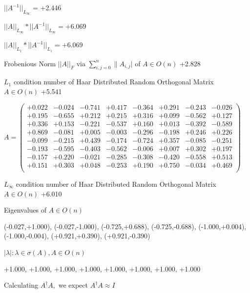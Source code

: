 \documentclass[9pt]{article}
\theoremstyle{plain}
\theoremstyle{definition}
\theoremstyle{remark}
\numberwithin{equation}{section}
\begin{document}
$||A^{-1}||_{L_{\infty}}$ = +2.446

$||A||_{L_{\infty}} * ||A^{-1}||_{L_{\infty}} = +6.069$

$||A||_{L_1} * ||A^{-1}||_{L_1} = +6.069$

Frobenious Norm  $||A||_{\textit{F}}$ via $\sum\limits_{i,j =0}^{n} \|A_{i,j}|$   of  $A \in O(n)$  +2.828

$L_1$ condition number of Haar Distributed Random Orthogonal Matrix $A \in O(n)$ +5.541

$A = \left(
\begin{array}{
cccccccc}
+0.022 & -0.024 & -0.741 & +0.417 & -0.364 & +0.291 & -0.243 & -0.026 \\
+0.195 & -0.655 & +0.212 & +0.215 & +0.316 & +0.099 & -0.562 & +0.127 \\
+0.336 & +0.153 & -0.221 & -0.537 & +0.160 & +0.013 & -0.392 & -0.589 \\
+0.869 & -0.081 & +0.005 & -0.003 & -0.296 & -0.198 & +0.246 & +0.226 \\
-0.099 & -0.215 & +0.439 & -0.174 & -0.724 & +0.357 & -0.085 & -0.251 \\
-0.193 & -0.595 & -0.403 & -0.562 & -0.006 & +0.007 & +0.302 & +0.197 \\
-0.157 & +0.220 & -0.021 & -0.285 & -0.308 & -0.420 & -0.558 & +0.513 \\
+0.151 & +0.303 & +0.048 & -0.253 & +0.190 & +0.750 & -0.034 & +0.469 \\
\end{array}
\right)$ \newline 

$L_{\infty}$ condition number of Haar Distributed Random Orthogonal Matrix $A \in O(n)$ +6.010

Eigenvalues of $A \in O(n)$

(-0.027,+1.000), (-0.027,-1.000), (-0.725,+0.688), (-0.725,-0.688), (-1.000,+0.004), (-1.000,-0.004), (+0.921,+0.390), (+0.921,-0.390)

 $|\lambda | : \lambda \in \sigma(A) , A \in O(n)$

+1.000, +1.000, +1.000, +1.000, +1.000, +1.000, +1.000, +1.000


Calculating $A^{\dag} A,$  we expect $A^{\dag} A \approx I$
\end{document}
